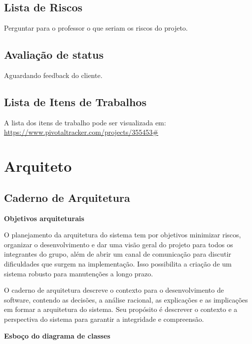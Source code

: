 \documentclass[12pt,letterpaper]{article}
\begin{document}
\pagebreak
\subsection{Lista de Riscos}

Perguntar para o professor o que seriam os riscos do projeto.

\pagebreak
\subsection{Avaliação de status}

Aguardando feedback do cliente.

\pagebreak
\subsection{Lista de Itens de Trabalhos}

A lista dos itens de trabalho pode ser visualizada em: \url{https://www.pivotaltracker.com/projects/355453#}


\pagebreak
\section{Arquiteto}

\subsection{Caderno de Arquitetura}

\vspace{1cm}
{\large {\bf Objetivos arquiteturais}}
\vspace{0.5cm}

O planejamento da arquitetura do sistema tem por objetivos minimizar riscos, organizar o desenvolvimento e
dar uma visão geral do projeto para todos os integrantes do grupo, além de abrir um canal de comunicação para discutir dificuldades que surgem na implementação. Isso possibilita a criação de um sistema robusto para manutenções a longo prazo.


O caderno de arquitetura descreve o contexto para o desenvolvimento de software, 
contendo as decisões, a análise racional, as explicações e as implicações em formar a 
arquitetura do sistema. Seu propósito é descrever o contexto e a perspectiva do sistema para 
garantir a integridade e compreensão.



\pagebreak

\vspace{1cm}
{\large {\bf Esboço do diagrama de classes}}
\vspace{0.5cm}
\end{document}
